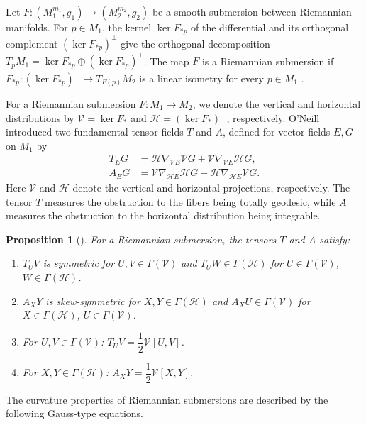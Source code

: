 \documentclass[11pt]{amsart}
\theoremstyle{plain}
\newtheorem{proposition}{Proposition}[section]
\theoremstyle{definition}
\theoremstyle{remark}
\newcommand{\calH}{\mathcal{H}}
\newcommand{\calV}{\mathcal{V}}
\begin{document}
Let $F:(M_1^{m_1},g_1)\to(M_2^{m_2},g_2)$ be a smooth submersion between
Riemannian manifolds. For $p\in M_1$, the kernel $\ker F_{*p}$ of the
differential and its orthogonal complement $(\ker F_{*p})^{\perp}$ give the
orthogonal decomposition $T_pM_1=\ker F_{*p}\oplus(\ker F_{*p})^{\perp}$. The
map $F$ is a {Riemannian submersion} if $F_{*p}:(\ker F_{*p})^{\perp}\to
T_{F(p)}M_2$ is a linear isometry for every $p\in M_1$ \cite{ONiell1966,
Falcitelli2004}.

For a Riemannian submersion $F : M_1 \to M_2$, we denote the 
vertical and horizontal distributions by 
$\calV = \ker F_*$ and $\calH = (\ker F_*)^\perp$, 
respectively. O'Neill \cite{ONiell1966} introduced two 
fundamental tensor fields $T$ and $A$, defined for vector 
fields $E, G$ on $M_1$ by
\begin{align}
T_E G &= \calH\nabla_{\calV E}\calV G 
        + \calV\nabla_{\calV E}\calH G, 
        \label{eq:tensor_T}\\
A_E G &= \calV\nabla_{\calH E}\calH G 
        + \calH\nabla_{\calH E}\calV G. 
        \label{eq:tensor_A}
\end{align}
Here $\calV$ and $\calH$ denote the vertical and horizontal 
projections, respectively. The tensor $T$ measures the 
obstruction to the fibers being totally geodesic, while $A$ 
measures the obstruction to the horizontal distribution being 
integrable.

\begin{proposition}[\cite{ONiell1966}]
\label{prop:oneill_tensors}
For a Riemannian submersion, the tensors $T$ and $A$ satisfy:
\begin{enumerate}[label=(\roman*)]
\item $T_U V$ is symmetric for $U,V \in \Gamma(\calV)$ and 
      $T_U W \in \Gamma(\calH)$ for $U \in \Gamma(\calV)$, 
      $W \in \Gamma(\calH)$.
\item $A_X Y$ is skew-symmetric for $X,Y \in \Gamma(\calH)$ 
      and $A_X U \in \Gamma(\calV)$ for $X \in \Gamma(\calH)$, 
      $U \in \Gamma(\calV)$.
\item For $U,V \in \Gamma(\calV)$: 
      $T_U V = \dfrac{1}{2}\calV[U,V]$.
\item For $X,Y \in \Gamma(\calH)$: 
      $A_X Y = \dfrac{1}{2}\calV[X,Y]$.
\end{enumerate}
\end{proposition}

The curvature properties of Riemannian submersions are 
described by the following Gauss-type equations.
\end{document}
